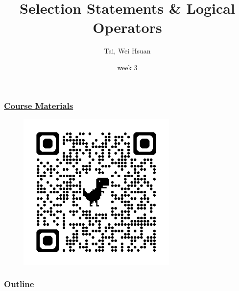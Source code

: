 \documentclass[xcolor=dvipsnames]{beamer}
\title{Selection Statements \& Logical Operators}
\author{Tai, Wei Hsuan}
\date{week 3}
\begin{document}
	\begin{frame}
		\titlepage
	\end{frame}


    \begin{frame}
        \frametitle{\href{https://drive.google.com/drive/folders/14Tkn-rddw0k1obeOxkWi00S43M0e9wlW?usp=sharing}{Course Materials}}
        \begin{figure}
            \centering
            \includegraphics[width=0.7\textwidth]{src/qrcode.png}
        \end{figure}
    \end{frame}

    \begin{frame}
        \frametitle{Outline}
        \tableofcontents
    \end{frame}
\end{document}
